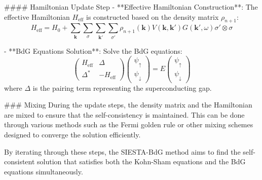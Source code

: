 #### Hamiltonian Update Step
- **Effective Hamiltonian Construction**:
  The effective Hamiltonian \( H_{\text{eff}} \) is constructed based on the density matrix \( \rho_{n+1} \):
  \[
  H_{\text{eff}} = H_0 + \sum_{\mathbf{k}} \sum_{\sigma} \sum_{\mathbf{k}'} \sum_{\sigma'} \rho_{n+1}(\mathbf{k}) V(\mathbf{k}, \mathbf{k}') G(\mathbf{k}', \omega) \sigma' \otimes \sigma
  \]

- **BdG Equations Solution**:
  Solve the BdG equations:
  \[
  \begin{pmatrix}
    H_{\text{eff}} & \Delta \\
    \Delta^* & -H_{\text{eff}}
  \end{pmatrix}
  \begin{pmatrix}
    \psi_{\uparrow} \\
    \psi_{\downarrow}
  \end{pmatrix} = E
  \begin{pmatrix}
    \psi_{\uparrow} \\
    \psi_{\downarrow}
  \end{pmatrix}
  \]
  where \( \Delta \) is the pairing term representing the superconducting gap.

### Mixing
During the update steps, the density matrix and the Hamiltonian are mixed to ensure that the self-consistency is maintained. This can be done through various methods such as the Fermi golden rule or other mixing schemes designed to converge the solution efficiently.

By iterating through these steps, the \textsc{SIESTA}-BdG method aims to find the self-consistent solution that satisfies both the Kohn-Sham equations and the BdG equations simultaneously.